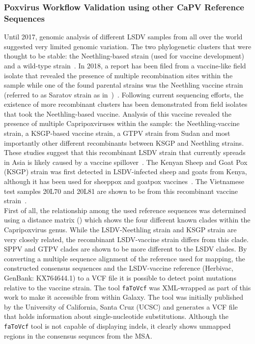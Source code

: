 \subsubsection*{Poxvirus Workflow Validation using other CaPV Reference Sequences}
Until 2017, genomic analysis of different \ac{LSDV} samples from all over the world suggested very limited genomic variation. The two phylogenetic clusters that were thought to be stable: the Neethling-based strain (used for vaccine development) and a wild-type strain~\cite{biswas2020extended}. In 2018, a report has been filed from a vaccine-like field isolate that revealed the presence of multiple recombination sites within the sample while one of the found parental strains was the Neethling vaccine strain (referred to as Saratov strain as in~)~\cite{sprygin2018analysis}. Following current sequencing efforts, the existence of more recombinant clusters has been demonstrated from field isolates that took the Neethling-based vaccine. Analysis of this vaccine revealed the presence of multiple Capripoxviruses within the sample: the Neethling-vaccine strain, a KSGP-based vaccine strain, a \ac{GTPV} strain from Sudan and most importantly other different recombinants between KSGP and Neethling strains. These studies suggest that this recombinant \ac{LSDV} strain that currently spreads in Asia is likely caused by a vaccine spillover~\cite{vandenbussche2022recombinant}. The Kenyan Sheep and Goat Pox (KSGP) strain was first detected in \ac{LSDV}-infected sheep and goats from Kenya, although it has been used for sheeppox and goatpox vaccines~\cite{tuppurainen2014characterization}. The Vietnamese test samples 20L70 and 20L81 are shown to be from this recombinant vaccine strain~\cite{vandenbussche2022recombinant}. \\
First of all, the relationship among the used reference sequences was determined using a distance matrix () which shows the four different known clades within the Capripoxvirus genus. While the \ac{LSDV}-Neethling strain and KSGP strain are very closely related, the recombinant \ac{LSDV}-vaccine strain differs from this clade. \ac{SPPV} and \ac{GTPV} clades are shown to be more different to the \ac{LSDV} clades. By converting a multiple sequence alignment of the reference used for mapping, the constructed consensus sequences and the \ac{LSDV}-vaccine reference (Herbivac, GenBank: KX764644.1) to a \ac{VCF} file it is possible to detect point mutations relative to the vaccine strain. The tool \texttt{faToVcf} was XML-wrapped as part of this work to make it accessible from within Galaxy. The tool was initially published by the University of California, Santa Cruz (UCSC) and generates a \ac{VCF} file that holds information about single-nucleotide substitutions. Although the \texttt{faToVcf} tool is not capable of displaying indels, it clearly shows unmapped regions in the consensus sequnces from the \ac{MSA}. \\
